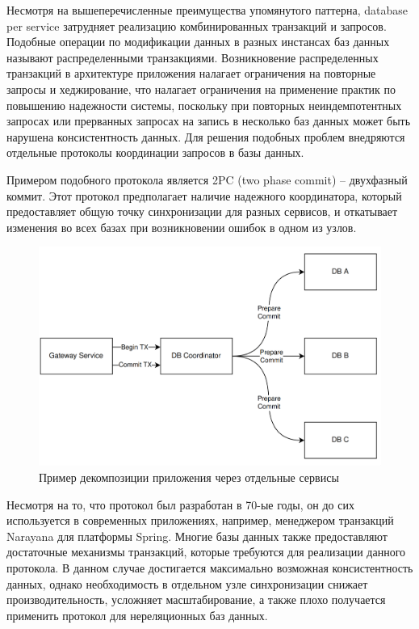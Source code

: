 Несмотря на вышеперечисленные преимущества упомянутого паттерна, database per service затрудняет реализацию комбинированных транзакций и запросов. 
Подобные операции по модификации данных в разных инстансах баз данных называют распределенными транзакциями.
Возникновение распределенных транзакций в архитектуре приложения налагает ограничения на повторные запросы и хеджирование, что налагает
ограничения на применение практик по повышению надежности системы, поскольку при повторных неиндемпотентных запросах или прерванных запросах на запись в несколько баз данных
может быть нарушена консистентность данных.
Для решения подобных проблем внедряются отдельные протоколы координации запросов в базы данных.

Примером подобного протокола является 2PC (two phase commit) -- двухфазный коммит. Этот протокол предполагает
наличие надежного координатора, который предоставляет общую точку синхронизации для разных сервисов, и откатывает изменения
во всех базах при возникновении ошибок в одном из узлов.
\begin{figure}[H]
    \centering
    \includegraphics[width=0.8\linewidth]{img/2pc.png}
    \caption{Пример декомпозиции приложения через отдельные сервисы}
    \label{fig:y}
\end{figure}

Несмотря на то, что протокол был разработан в 70-ые годы, он до сих используется в современных приложениях, например,
менеджером транзакций Narayana для платформы Spring. Многие базы данных также предоставляют достаточные механизмы транзакций, которые
требуются для реализации данного протокола. В данном случае достигается максимально возможная консистентность данных, однако
необходимость в отдельном узле синхронизации снижает производительность, усложняет масштабирование, а также плохо получается применить
протокол для нереляционных баз данных.


